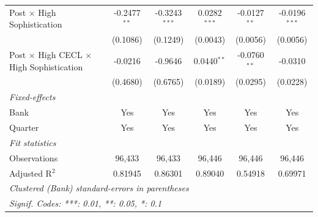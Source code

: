 \begin{tabular}{lccccc}
   Post $\times$ High Sophistication                      & -0.2477$^{**}$                & -0.3243$^{***}$             & 0.0282$^{***}$        & -0.0127$^{**}$ & -0.0196$^{***}$\\   
                                                          & (0.1086)                      & (0.1249)                    & (0.0043)              & (0.0056)       & (0.0056)\\   
   Post $\times$ High CECL $\times$ High Sophistication   & -0.0216                       & -0.9646                     & 0.0440$^{**}$         & -0.0760$^{**}$ & -0.0310\\   
                                                          & (0.4680)                      & (0.6765)                    & (0.0189)              & (0.0295)       & (0.0228)\\   
   \midrule
   \emph{Fixed-effects}\\
   Bank                                                   & Yes                           & Yes                         & Yes                   & Yes            & Yes\\  
   Quarter                                                & Yes                           & Yes                         & Yes                   & Yes            & Yes\\  
   \midrule
   \emph{Fit statistics}\\
   Observations                                           & 96,433                        & 96,433                      & 96,446                & 96,446         & 96,446\\  
   Adjusted R$^2$                                         & 0.81945                       & 0.86301                     & 0.89040               & 0.54918        & 0.69971\\  
   \midrule \midrule
   \multicolumn{6}{l}{\emph{Clustered (Bank) standard-errors in parentheses}}\\
   \multicolumn{6}{l}{\emph{Signif. Codes: ***: 0.01, **: 0.05, *: 0.1}}\\
\end{tabular}
\par\endgroup


